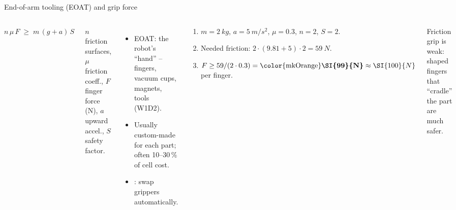 \documentclass[aspectratio=169,10pt]{beamer}
\renewcommand{\hl}[1]{\text{\color{mkOrange}\bfseries #1}}
\begin{document}
\begin{frame}[t]{End-of-arm tooling (EOAT) and grip force}
\begin{columns}[T,onlytextwidth]
\centering
{}
\begin{eqbox}\small
$n\,\mu\,F \;\ge\; m\,(g+a)\,S$
\end{eqbox}
\footnotesize $n$ friction surfaces, $\mu$ friction coeff., $F$ finger force (N), $a$ upward accel., $S$ safety factor.
\begin{itemize}\small
\item EOAT: the robot's ``hand'' -- fingers, vacuum cups, magnets, tools (W1D2).
\item Usually custom-made for each part; often 10--30\,\% of cell cost.
\item {}: swap grippers automatically.
\end{itemize}
\begin{defbox}
\footnotesize
\begin{enumerate}
\item $m=\SI{2}{kg}$, $a=\SI{5}{m/s^2}$, $\mu=0.3$, $n=2$, $S=2$.
\item Needed friction: $2\cdot(9.81+5)\cdot 2 = \SI{59}{N}$.
\item $F \ge 59/(2\cdot0.3) = \hl{\SI{99}{N}} \approx \SI{100}{N}$ per finger.
\end{enumerate}
\end{defbox}
\footnotesize Friction grip is weak: shaped fingers that ``cradle'' the part are much safer.
\end{columns}
\end{frame}
\end{document}

